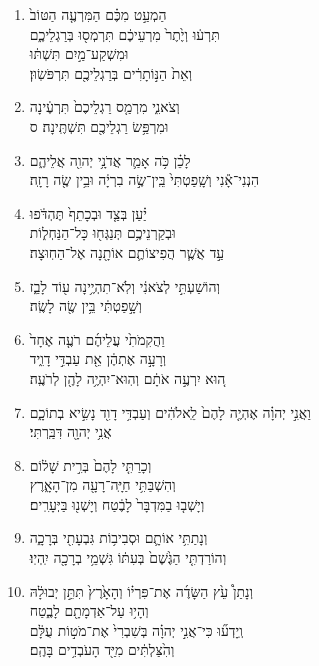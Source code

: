\documentclass[12pt,a4paper,titlepage]{article}
\def \pslabelsep{-0.9em} %
\def \psleftmargin{0em} %
\begin{document}
\begin{enumerate}[leftmargin=\psleftmargin, labelsep = \pslabelsep, label={\arabic*}, font=\color{\pscolor}\small\textsuperscript, parsep=0em, itemsep=0em, topsep=0em ]
\item \texthebrew{הַמְעַ֣ט מִכֶּ֗ם הַמִּרְעֶ֤ה הַטּוֹב֙ \\ תִּרְע֔וּ וְיֶ֙תֶר֙ מִרְעֵיכֶ֔ם תִּרְמְס֖וּ בְּרַגְלֵיכֶ֑ם \\ וּמִשְׁקַע־מַ֣יִם תִּשְׁתּ֔וּ \\ וְאֵת֙ הַנּ֣וֹתָרִ֔ים בְּרַגְלֵיכֶ֖ם תִּרְפֹּשֽׂוּן׃}
\item \texthebrew{וְצֹאנִ֑י מִרְמַ֤ס רַגְלֵיכֶם֙ תִּרְעֶ֔ינָה \\ וּמִרְפַּ֥שׂ רַגְלֵיכֶ֖ם תִּשְׁתֶּֽינָה׃ ס}\parSpace

\item \texthebrew{לָכֵ֗ן כֹּ֥ה אָמַ֛ר אֲדֹנָ֥י יְהוִ֖ה אֲלֵיהֶ֑ם \\ הִנְנִי־אָ֕נִי וְשָֽׁפַטְתִּי֙ בֵּֽין־שֶׂ֣ה בִרְיָ֔ה וּבֵ֥ין שֶׂ֖ה רָזָֽה׃}
\item \texthebrew{יַ֗עַן בְּצַ֤ד וּבְכָתֵף֙ תֶּהְדֹּ֔פוּ \\ וּבְקַרְנֵיכֶ֥ם תְּנַגְּח֖וּ כָּל־הַנַּחְל֑וֹת \\ עַ֣ד אֲשֶׁ֧ר הֲפִיצוֹתֶ֛ם אוֹתָ֖נָה אֶל־הַחֽוּצָה׃}
\item \texthebrew{וְהוֹשַׁעְתִּ֣י לְצֹאנִ֔י וְלֹֽא־תִהְיֶ֥ינָה ע֖וֹד לָבַ֑ז \\ וְשָׁ֣פַטְתִּ֔י בֵּ֥ין שֶׂ֖ה לָשֶֽׂה׃}
\item \texthebrew{וַהֲקִמֹתִ֙י עֲלֵיהֶ֜ם רֹעֶ֤ה אֶחָד֙ \\ וְרָעָ֣ה אֶתְהֶ֔ן אֵ֖ת עַבְדִּ֣י דָוִ֑יד \\ ה֚וּא יִרְעֶ֣ה אֹתָ֔ם וְהֽוּא־יִהְיֶ֥ה לָהֶ֖ן לְרֹעֶֽה׃}
\item \texthebrew{וַאֲנִ֣י יְהוָ֗ה אֶהְיֶ֤ה לָהֶם֙ לֵֽאלֹהִ֔ים וְעַבְדִּ֥י דָוִ֖ד נָשִׂ֣יא בְתוֹכָ֑ם \\ אֲנִ֥י יְהוָ֖ה דִּבַּֽרְתִּי׃}
\item \texthebrew{וְכָרַתִּ֤י לָהֶם֙ בְּרִ֣ית שָׁל֔וֹם \\ וְהִשְׁבַּתִּ֥י חַיָּֽה־רָעָ֖ה מִן־הָאָ֑רֶץ \\ וְיָשְׁב֤וּ בַמִּדְבָּר֙ לָבֶ֔טַח וְיָשְׁנ֖וּ בַּיְּעָרִֽים׃}
\item \texthebrew{וְנָתַתִּ֥י אוֹתָ֛ם וּסְבִיב֥וֹת גִּבְעָתִ֖י בְּרָכָ֑ה \\ וְהוֹרַדְתִּ֤י הַגֶּ֙שֶׁם֙ בְּעִתּ֔וֹ גִּשְׁמֵ֥י בְרָכָ֖ה יִֽהְיֽוּ׃}
\item \texthebrew{וְנָתַן֩ עֵ֙ץ הַשָּׂדֶ֜ה אֶת־פִּרְי֗וֹ וְהָאָ֙רֶץ֙ תִּתֵּ֣ן יְבוּלָ֔הּ \\ וְהָי֥וּ עַל־אַדְמָתָ֖ם לָבֶ֑טַח \\ וְֽיָדְע֞וּ כִּי־אֲנִ֣י יְהוָ֗ה בְּשִׁבְרִי֙ אֶת־מֹט֣וֹת עֻלָּ֔ם \\ וְהִ֙צַּלְתִּ֔ים מִיַּ֖ד הָעֹבְדִ֥ים בָּהֶֽם׃}

\end{enumerate}
\end{document}
